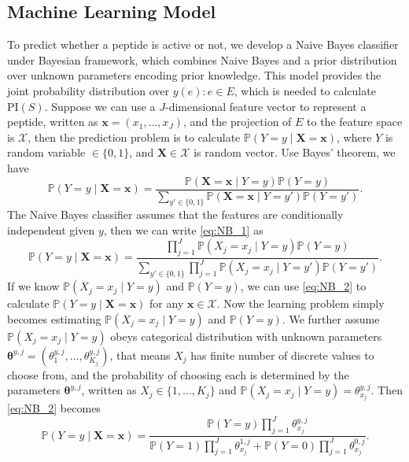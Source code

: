 \documentclass[11pt]{article}
\newcommand{\Prob}{\mathbb{P}}
\newcommand{\PI}{\text{PI}}
\begin{document}
\subsection{Machine Learning Model} \label{sec:stat model}
To predict whether a peptide is active or not, we develop a Naive Bayes classifier 
under Bayesian framework, which combines Naive Bayes and a prior distribution over
unknown parameters encoding prior knowledge. This model provides the joint probability
distribution over $y(e): e \in E$, which is needed to calculate $\PI(S)$. Suppose we 
can use a $J$-dimensional feature vector to represent a peptide, written as
$\bm{x} = (x_1, \ldots, x_J)$, and the projection of $E$ to the feature space is
$\mathcal{X}$, then the prediction problem is to calculate
$\Prob (Y = y \mid \bm{X} = \bm{x})$, where $Y$ is random variable $\in \{0, 1\}$,
and $\bm{X} \in \mathcal{X}$ is random vector. Use Bayes' theorem, we have
\begin{equation}
  \Prob(Y = y \mid \bm{X} = \bm{x}) = \frac{\Prob(\bm{X} = \bm{x} \mid Y = y) \Prob(Y = y)}{\sum_{y' \in \{0, 1\}} \Prob(\bm{X}= \bm{x} \mid Y = y') \Prob(Y = y')}.
  \label{eq:NB_1}
\end{equation}
The Naive Bayes classifier assumes that the features are conditionally independent 
given $y$, then we can write \eqref{eq:NB_1} as 
\begin{equation}
  \Prob(Y = y \mid \bm{X} = \bm{x}) = \frac{\prod_{j = 1}^J \Prob(X_j = x_j \mid Y = y) \Prob(Y = y)}{\sum_{y' \in \{0, 1\}} \prod_{j = 1}^J \Prob(X_j = x_j \mid Y = y') \Prob(Y = y')}.
  \label{eq:NB_2}
\end{equation}
If we know $\Prob(X_j = x_j \mid Y = y)$ and $\Prob(Y = y)$, we can use \eqref{eq:NB_2} 
to calculate $\Prob(Y = y \mid \bm{X} = \bm{x})$ for any $\bm{x} \in \mathcal{X}$. Now the learning
problem simply becomes estimating $\Prob(X_j = x_j \mid Y = y)$ and $\Prob(Y = y)$.
We further assume $\Prob(X_j = x_j \mid Y = y)$ obeys categorical distribution with
unknown parameters $\bm{\theta}^{y, j} = (\theta^{y, j}_1, \ldots, \theta^{y, j}_{K_j})$,
that means $X_j$ has finite number of discrete values to choose from, and the probability
of choosing each is determined by the parameters $\bm{\theta}^{y, j}$, written as
$X_j \in \{1, \ldots, K_j\}$ and $\Prob(X_j = x_j \mid Y = y) = \theta^{y, j}_{x_j}$.
Then \eqref{eq:NB_2} becomes
\begin{equation}
  \Prob (Y = y \mid \bm{X} = \bm{x}) = \frac{\Prob(Y = y) \prod_{j=1}^J \theta^{y, j}_{x_j}}
  {\Prob(Y = 1) \prod_{j=1}^J \theta^{1,j}_{x_j} + \Prob(Y = 0) \prod_{j=1}^J \theta^{0,j}_{x_j}}.
  \label{eq:NB_3}
\end{equation}
\end{document}
